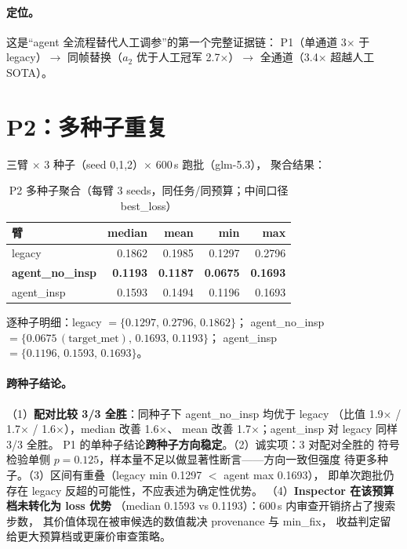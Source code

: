 \documentclass[11pt,a4paper]{ctexart}
\begin{document}
\paragraph{定位。}这是``agent 全流程替代人工调参''的第一个完整证据链：
P1（单通道 3$\times$ 于 legacy）$\to$ 同帧替换（$a_2$ 优于人工冠军
2.7$\times$）$\to$ 全通道（3.4$\times$ 超越人工 SOTA）。

\section{P2：多种子重复}

三臂 $\times$ 3 种子（seed 0,1,2）$\times$ 600\,s 跑批（glm-5.3），
聚合结果：

\begin{table}[htbp]\centering\small
\caption{P2 多种子聚合（每臂 3 seeds，同任务/同预算；中间口径 best\_loss）}
\begin{tabular}{@{}lrrrr@{}}
\toprule
臂 & median & mean & min & max \\
\midrule
legacy & 0.1862 & 0.1985 & 0.1297 & 0.2796 \\
\textbf{agent\_no\_insp} & \textbf{0.1193} & \textbf{0.1187} & \textbf{0.0675} & \textbf{0.1693} \\
agent\_insp & 0.1593 & 0.1494 & 0.1196 & 0.1693 \\
\bottomrule
\end{tabular}

\vspace{4pt}
{\footnotesize 逐种子明细：legacy $= \{0.1297,\,0.2796,\,0.1862\}$；
agent\_no\_insp $= \{0.0675\,(\text{target\_met}),\,0.1693,\,0.1193\}$；
agent\_insp $= \{0.1196,\,0.1593,\,0.1693\}$。}
\end{table}

\paragraph{跨种子结论。}
（1）\textbf{配对比较 3/3 全胜}：同种子下 agent\_no\_insp 均优于 legacy
（比值 1.9$\times$ / 1.7$\times$ / 1.6$\times$），median 改善 1.6$\times$、
mean 改善 1.7$\times$；agent\_insp 对 legacy 同样 3/3 全胜。
P1 的单种子结论\textbf{跨种子方向稳定}。（2）诚实项：3 对配对全胜的
符号检验单侧 $p=0.125$，样本量不足以做显著性断言——方向一致但强度
待更多种子。（3）区间有重叠（legacy min 0.1297 $<$ agent max 0.1693），
即单次跑批仍存在 legacy 反超的可能性，不应表述为确定性优势。
（4）\textbf{Inspector 在该预算档未转化为 loss 优势}
（median 0.1593 vs 0.1193）：600\,s 内审查开销挤占了搜索步数，
其价值体现在被审候选的数值裁决 provenance 与 min\_fix，
收益判定留给更大预算档或更廉价审查策略。
\end{document}

